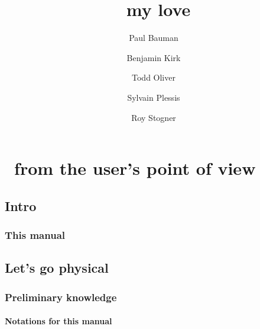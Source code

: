 \documentclass[twoside]{report}
\begin{document}
\title{\Antioch\ my love}
\date{\theversion}
\author{Paul Bauman \and Benjamin Kirk \and Todd Oliver \and Sylvain Plessis \and Roy Stogner}

\maketitle
\tableofcontents
\listoffigures
\listoftables



\part{\Antioch\ from the user's point of view}
\chapter{Intro}

\section{This manual}


\chapter{Let's go physical}
\chaptermark{\ANTIOCHPhys}
\label{Antioch:physics}

\section{Preliminary knowledge}

\subsection{Notations for this manual}

\end{document}
